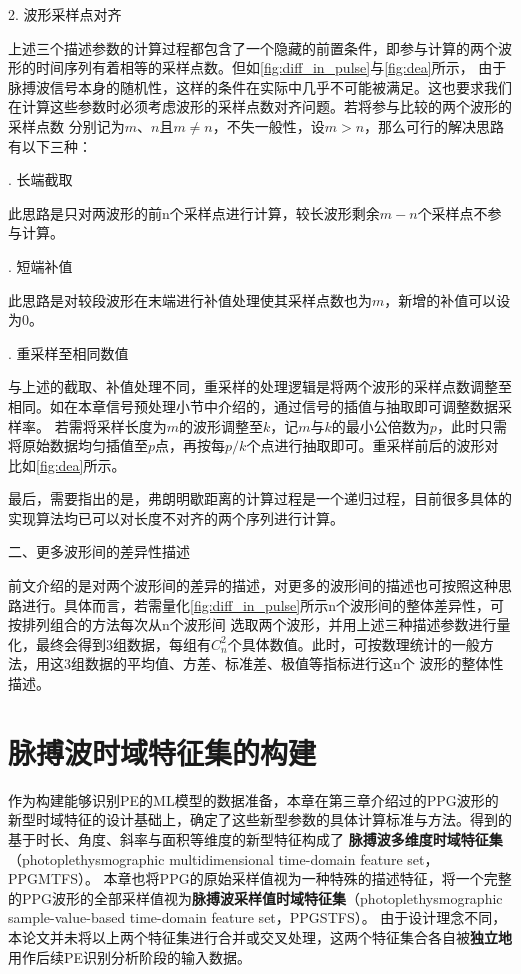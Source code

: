 2. 波形采样点对齐

上述三个描述参数的计算过程都包含了一个隐藏的前置条件，即参与计算的两个波形的时间序列有着相等的采样点数。但如\autoref{fig:diff_in_pulse}与\autoref{fig:dea}所示，
由于脉搏波信号本身的随机性，这样的条件在实际中几乎不可能被满足。这也要求我们在计算这些参数时必须考虑波形的采样点数对齐问题。若将参与比较的两个波形的采样点数
分别记为$m$、$n$且$m \neq n$，不失一般性，设$m>n$，那么可行的解决思路有以下三种：

. 长端截取

此思路是只对两波形的前n个采样点进行计算，较长波形剩余$m-n$个采样点不参与计算。

. 短端补值

此思路是对较段波形在末端进行补值处理使其采样点数也为$m$，新增的补值可以设为0。

. 重采样至相同数值

与上述的截取、补值处理不同，重采样的处理逻辑是将两个波形的采样点数调整至相同。如在本章信号预处理小节中介绍的，通过信号的插值与抽取即可调整数据采样率。
若需将采样长度为$m$的波形调整至$k$，记$m$与$k$的最小公倍数为$p$，此时只需将原始数据均匀插值至$p$点，再按每$p/k$个点进行抽取即可。重采样前后的波形对比如\autoref{fig:dea}所示。

最后，需要指出的是，弗朗明歇距离的计算过程是一个递归过程，目前很多具体的实现算法均已可以对长度不对齐的两个序列进行计算\cite{derohde2022}。

二、更多波形间的差异性描述

前文介绍的是对两个波形间的差异的描述，对更多的波形间的描述也可按照这种思路进行。具体而言，若需量化\autoref{fig:diff_in_pulse}所示n个波形间的整体差异性，可按排列组合的方法每次从n个波形间
选取两个波形，并用上述三种描述参数进行量化，最终会得到3组数据，每组有$C_n^2$个具体数值。此时，可按数理统计的一般方法，用这3组数据的平均值、方差、标准差、极值等指标进行这n个
波形的整体性描述。

\section{脉搏波时域特征集的构建}
作为构建能够识别PE的ML模型的数据准备，本章在第三章介绍过的PPG波形的新型时域特征的设计基础上，确定了这些新型参数的具体计算标准与方法。得到的基于时长、角度、斜率与面积等维度的新型特征构成了
\textbf{脉搏波多维度时域特征集}（photoplethysmographic multidimensional time-domain feature set，PPGMTFS）。
本章也将PPG的原始采样值视为一种特殊的描述特征，将一个完整的PPG波形的全部采样值视为\textbf{脉搏波采样值时域特征集}（photoplethysmographic sample-value-based time-domain feature set，PPGSTFS）。
由于设计理念不同，本论文并未将以上两个特征集进行合并或交叉处理，这两个特征集合各自被\textbf{独立地}用作后续PE识别分析阶段的输入数据。

